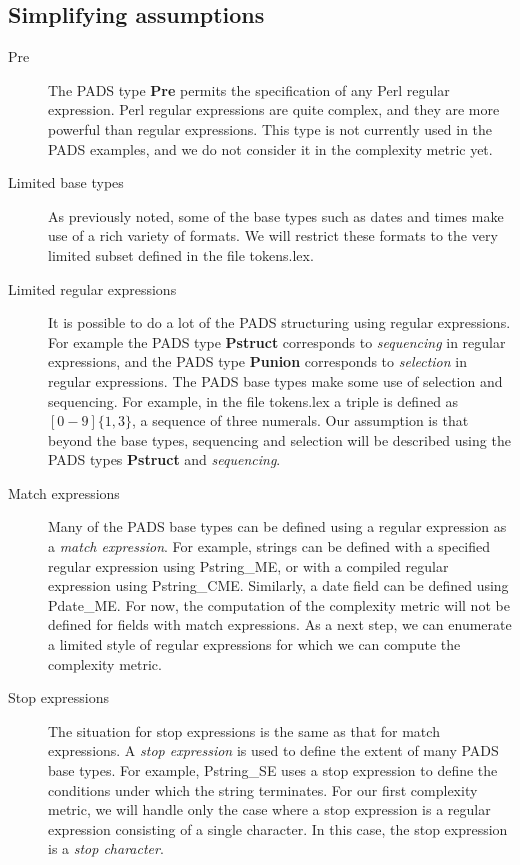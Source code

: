 \subsection{Simplifying assumptions}

\begin{description}

\item [Pre]
The PADS type \textbf{Pre} permits the specification of any Perl
regular expression. Perl regular expressions are quite complex, and
they are more powerful than regular expressions. This type is not
currently used in the PADS examples, and we do not consider it in the
complexity metric yet.

\item [Limited base types]
As previously noted, some of the base types such as dates and times
make use of a rich variety of formats. We will restrict these formats
to the very limited subset defined in the file \textsf{tokens.lex}.

\item [Limited regular expressions]
It is possible to do a lot of the PADS structuring using regular
expressions. For example the PADS type \textbf{Pstruct} corresponds to
\textit{sequencing} in regular expressions, and the PADS type
\textbf{Punion} corresponds to \textit{selection} in regular
expressions. The PADS base types make some use of selection and
sequencing. For example, in the file \textsf{tokens.lex} a
\textsf{triple} is defined as $[0-9]\{1,3\}$, a sequence of three
numerals. Our assumption is that beyond the base types, sequencing
and selection will be described using the PADS types \textbf{Pstruct}
and \textit{sequencing}.

\item [Match expressions]
Many of the PADS base types can be defined using a regular expression
as a \textit{match expression}. For example, strings can be defined
with a specified regular expression using \textsf{Pstring\_ME}, or with
a compiled regular expression using \textsf{Pstring\_CME}. Similarly,
a date field can be defined using \textsf{Pdate\_ME}. For now, the
computation of the complexity metric will not be defined for fields
with match expressions. As a next step, we can enumerate a limited
style of regular expressions for which we can compute the complexity
metric.

\item [Stop expressions]
The situation for stop expressions is the same as that for match
expressions. A \textit{stop expression} is used to define the extent
of many PADS base types. For example, \textsf{Pstring\_SE} uses a stop
expression to define the conditions under which the string
terminates. For our first complexity metric, we will handle only the
case where a stop expression is a regular expression consisting of a
single character. In this case, the stop expression is a
\textit{stop character}.


\end{description}
